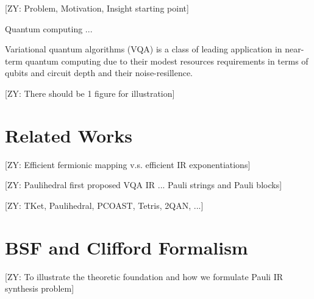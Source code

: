 \documentclass[conference]{IEEEtran}
\newcommand{\ZY}[1]{{\color{purple}[ZY: #1]}}
\begin{document}
    \ZY{Problem, Motivation, Insight starting point}

    Quantum computing ...

    Variational quantum algorithms (VQA) is a class of leading application in near-term quantum computing due to their modest resources requirements in terms of qubits and circuit depth and their noise-resillence.

    \ZY{There should be 1 figure for illustration}
    







\section{Related Works}


\ZY{Efficient fermionic mapping v.s. efficient IR exponentiations}

\ZY{Paulihedral first proposed VQA IR ... Pauli strings and Pauli blocks}

\ZY{TKet, Paulihedral, PCOAST, Tetris, 2QAN, ...}





\section{BSF and Clifford Formalism}

\ZY{To illustrate the theoretic foundation and how we formulate Pauli IR synthesis problem}
\end{document}
